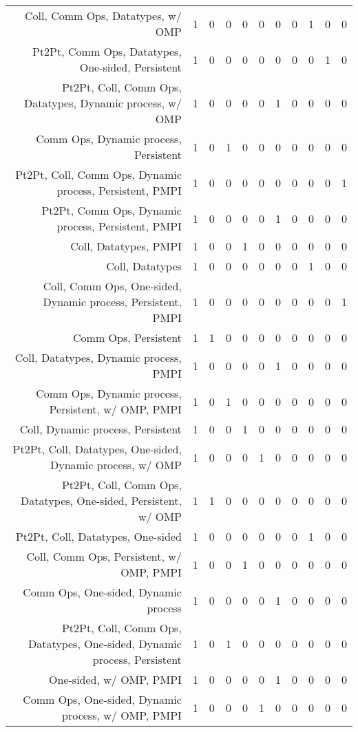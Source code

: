 {\begin{landscape}
\begin{longtable}[htb]{r|c|c|c|c|c|c|c|c|c|c}
{Coll, Comm Ops, Datatypes, w/ OMP} & 1 & 0 & 0 & 0 & 0 & 0 & 0 & 1 & 0 & 0 \\%
{Pt2Pt, Comm Ops, Datatypes, One-sided, Persistent} & 1 & 0 & 0 & 0 & 0 & 0 & 0 & 0 & 1 & 0 \\%
{Pt2Pt, Coll, Comm Ops, Datatypes, Dynamic process, w/ OMP} & 1 & 0 & 0 & 0 & 0 & 1 & 0 & 0 & 0 & 0 \\%
{Comm Ops, Dynamic process, Persistent} & 1 & 0 & 1 & 0 & 0 & 0 & 0 & 0 & 0 & 0 \\%
{Pt2Pt, Coll, Comm Ops, Dynamic process, Persistent, PMPI} & 1 & 0 & 0 & 0 & 0 & 0 & 0 & 0 & 0 & 1 \\%
{Pt2Pt, Comm Ops, Dynamic process, Persistent, PMPI} & 1 & 0 & 0 & 0 & 0 & 1 & 0 & 0 & 0 & 0 \\%
{Coll, Datatypes, PMPI} & 1 & 0 & 0 & 1 & 0 & 0 & 0 & 0 & 0 & 0 \\%
{Coll, Datatypes} & 1 & 0 & 0 & 0 & 0 & 0 & 0 & 1 & 0 & 0 \\%
{Coll, Comm Ops, One-sided, Dynamic process, Persistent, PMPI} & 1 & 0 & 0 & 0 & 0 & 0 & 0 & 0 & 0 & 1 \\%
{Comm Ops, Persistent} & 1 & 1 & 0 & 0 & 0 & 0 & 0 & 0 & 0 & 0 \\%
{Coll, Datatypes, Dynamic process, PMPI} & 1 & 0 & 0 & 0 & 0 & 1 & 0 & 0 & 0 & 0 \\%
{Comm Ops, Dynamic process, Persistent, w/ OMP, PMPI} & 1 & 0 & 1 & 0 & 0 & 0 & 0 & 0 & 0 & 0 \\%
{Coll, Dynamic process, Persistent} & 1 & 0 & 0 & 1 & 0 & 0 & 0 & 0 & 0 & 0 \\%
{Pt2Pt, Coll, Datatypes, One-sided, Dynamic process, w/ OMP} & 1 & 0 & 0 & 0 & 1 & 0 & 0 & 0 & 0 & 0 \\%
{Pt2Pt, Coll, Comm Ops, Datatypes, One-sided, Persistent, w/ OMP} & 1 & 1 & 0 & 0 & 0 & 0 & 0 & 0 & 0 & 0 \\%
{Pt2Pt, Coll, Datatypes, One-sided} & 1 & 0 & 0 & 0 & 0 & 0 & 0 & 1 & 0 & 0 \\%
{Coll, Comm Ops, Persistent, w/ OMP, PMPI} & 1 & 0 & 0 & 1 & 0 & 0 & 0 & 0 & 0 & 0 \\%
{Comm Ops, One-sided, Dynamic process} & 1 & 0 & 0 & 0 & 0 & 1 & 0 & 0 & 0 & 0 \\%
{Pt2Pt, Coll, Comm Ops, Datatypes, One-sided, Dynamic process, Persistent} & 1 & 0 & 1 & 0 & 0 & 0 & 0 & 0 & 0 & 0 \\%
{One-sided, w/ OMP, PMPI} & 1 & 0 & 0 & 0 & 0 & 1 & 0 & 0 & 0 & 0 \\%
{Comm Ops, One-sided, Dynamic process, w/ OMP, PMPI} & 1 & 0 & 0 & 0 & 1 & 0 & 0 & 0 & 0 & 0 \\%

\end{longtable}
\end{landscape}}
